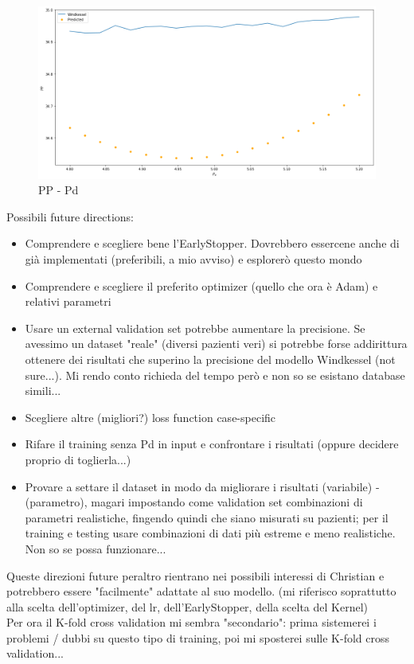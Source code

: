 \newpage
\begin{figure}[h]
    \centering
    \includegraphics[width=1\textwidth]{images/Training - temp/PP - Pd.png}
    \caption{PP - Pd}
\end{figure}


















\newpage
Possibili future directions:
\begin{itemize}
    \item Comprendere e scegliere bene l'EarlyStopper. Dovrebbero essercene anche di già implementati (preferibili, a mio avviso) e esplorerò questo mondo
    \item Comprendere e scegliere il preferito optimizer (quello che ora è Adam) e relativi parametri
    \item Usare un external validation set potrebbe aumentare la precisione. Se avessimo un dataset "reale" (diversi pazienti veri) si potrebbe forse addirittura ottenere dei risultati che superino la precisione del modello Windkessel (not sure...). Mi rendo conto richieda del tempo però e non so se esistano database simili...
    \item Scegliere altre (migliori?) loss function case-specific
    \item Rifare il training senza Pd in input e confrontare i risultati (oppure decidere proprio di toglierla...)
    \item Provare a settare il dataset in modo da migliorare i risultati (variabile) - (parametro), magari impostando come validation set combinazioni di parametri realistiche, fingendo quindi che siano misurati su pazienti; per il training e testing usare combinazioni di dati più estreme e meno realistiche. Non so se possa funzionare...
\end{itemize}

Queste direzioni future peraltro rientrano nei possibili interessi di Christian e potrebbero essere "facilmente" adattate al suo modello. (mi riferisco soprattutto alla scelta dell'optimizer, del lr, dell'EarlyStopper, della scelta del Kernel)\\

Per ora il K-fold cross validation mi sembra "secondario": prima sistemerei i problemi / dubbi su questo tipo di training, poi mi sposterei sulle K-fold cross validation... 